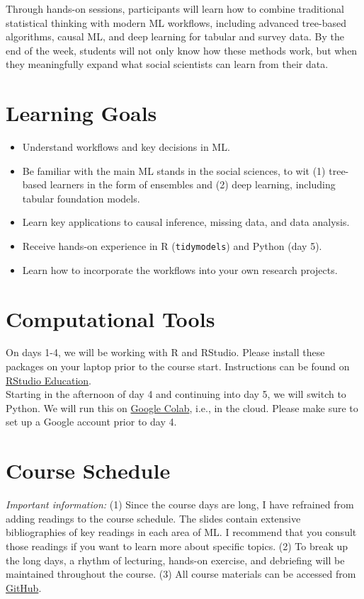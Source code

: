 \documentclass{article}
\begin{document}
\noindent Through hands-on sessions, participants will learn how to combine traditional statistical thinking with modern ML workflows, including advanced tree-based algorithms, causal ML, and deep learning for tabular and survey data. By the end of the week, students will not only know how these methods work, but when they meaningfully expand what social scientists can learn from their data.

\section{Learning Goals}
\begin{itemize}
	\item Understand workflows and key decisions in ML.
	\item Be familiar with the main ML stands in the social sciences, to wit (1) tree-based learners in the form of ensembles and (2) deep learning, including tabular foundation models.
	\item Learn key applications to causal inference, missing data, and data analysis.
	\item Receive hands-on experience in R (\texttt{tidymodels}) and Python (day 5).
	\item Learn how to incorporate the workflows into your own research projects.
\end{itemize}

\section{Computational Tools}
On days 1-4, we will be working with R and RStudio. Please install these packages on your laptop prior to the course start. Instructions can be found on \href{https://rstudio-education.github.io/hopr/starting.html}{RStudio Education}. \\

\noindent Starting in the afternoon of day 4 and continuing into day 5, we will switch to Python. We will run this on \href{https://colab.research.google.com/}{Google Colab}, i.e., in the cloud. Please make sure to set up a Google account prior to day 4.

\section{Course Schedule}
\emph{Important information:} (1) Since the course days are long, I have refrained from adding readings to the course schedule. The slides contain extensive bibliographies of key readings in each area of ML. I recommend that you consult those readings if you want to learn more about specific topics. (2) To break up the long days, a rhythm of lecturing, hands-on exercise, and debriefing will be maintained throughout the course. (3) All course materials can be accessed from \href{https://github.com/steenbergen/lugano26}{GitHub}.
\end{document}
